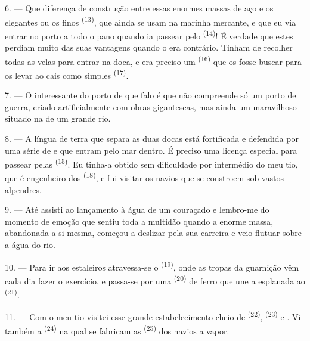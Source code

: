 6. --- Que diferença de construção entre essas enormes massas de aço e os
elegantes  ou os finos 
\textsuperscript{(13)}, que ainda se usam na marinha mercante, e que eu via
entrar no porto a todo o pano quando ia passear pelo 
\textsuperscript{(14)}! É verdade que estes perdiam muito das suas vantagens
quando o  era contrário. Tinham de recolher todas as velas
para entrar na doca, e era preciso um 
\textsuperscript{(16)} que os fosse buscar para os levar ao cais como simples
 \textsuperscript{(17)}.

\VUsaut{3.0mm}
\VUsaut{3.0mm}

7. --- O interessante do porto de que falo é que não compreende só um
porto de guerra, criado artificialmente com obras gigantescas, mas ainda
um maravilhoso  situado na  de um
grande rio.

8. --- A língua de terra que separa as duas docas está fortificada e
defendida por uma série de  e  que
entram pelo mar dentro. É preciso uma licença especial para passear pelas
 \textsuperscript{(15)}. Eu tinha-a obtido sem dificuldade por
intermédio do meu tio, que é engenheiro dos 
\textsuperscript{(18)}, e fui visitar os navios que se constroem sob vastos
alpendres.

9. --- Até assisti ao lançamento à água de um couraçado e lembro-me do
momento de emoção que sentiu toda a multidão quando a enorme massa,
abandonada a si mesma, começou a deslizar pela sua carreira e veio
flutuar sobre a água do rio.

10. --- Para ir aos estaleiros atravessa-se o 
\textsuperscript{(19)}, onde as tropas da guarnição vêm cada dia fazer o
exercício, e passa-se por uma  \textsuperscript{(20)} de ferro
que une a esplanada ao  \textsuperscript{(21)}.

\VUsaut{3.0mm}
\VUsaut{3.0mm}

11. --- Com o meu tio visitei esse grande estabelecimento cheio de
 \textsuperscript{(22)},  \textsuperscript{(23)} e
. Vi também a  \textsuperscript{(24)} na
qual se fabricam as  \textsuperscript{(25)} dos navios a vapor.

